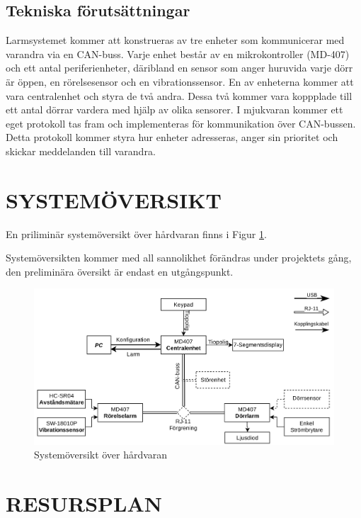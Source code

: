 \documentclass[a4paper]{article}
\begin{document}
\subsection{Tekniska förutsättningar}
\label{sec:tekniskaf}
Larmsystemet kommer att konstrueras av tre enheter som kommunicerar med varandra via en CAN-buss. Varje enhet består av en mikrokontroller (MD-407) och ett antal periferienheter, däribland en sensor som anger huruvida varje dörr är öppen, en rörelsesensor och en vibrationssensor. En av enheterna kommer att vara centralenhet och styra de två andra. Dessa två kommer vara koppplade till ett antal dörrar vardera med hjälp av olika sensorer.
I mjukvaran kommer ett eget protokoll tas fram och implementeras för kommunikation över CAN-bussen. Detta protokoll kommer styra hur enheter adresseras, anger sin prioritet och skickar meddelanden till varandra.



\section{SYSTEMÖVERSIKT}
\label{sec:systemö}
En priliminär systemöversikt över hårdvaran finns i Figur \ref{fig:hardware}.

Systemöversikten kommer med all sannolikhet förändras under projektets gång, den preliminära översikt är endast en utgångspunkt.
\begin{figure}[!ht]
	\includegraphics[width=1\textwidth]{figurer/Systemoversikt.jpg}
	\caption{Systemöversikt över hårdvaran}
	\label{fig:hardware}
\end{figure}

\section{RESURSPLAN}
\label{sec:resurs}
\end{document}
